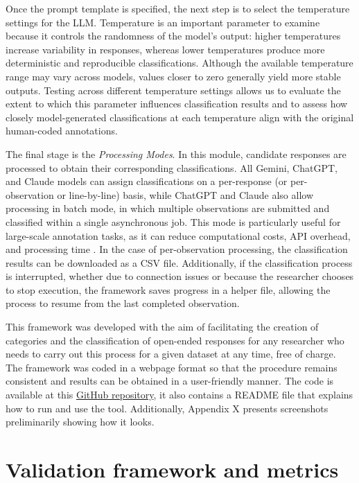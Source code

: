 \documentclass[11pt]{article}
\begin{document}
\begin{sloppypar}
Once the prompt template is specified, the next step is to select the temperature settings for the LLM. Temperature is an important parameter to examine because it controls the randomness of the model’s output: higher temperatures increase variability in responses, whereas lower temperatures produce more deterministic and reproducible classifications. Although the available temperature range may vary across models, values closer to zero generally yield more stable outputs. Testing across different temperature settings allows us to evaluate the extent to which this parameter influences classification results and to assess how closely model-generated classifications at each temperature align with the original human-coded annotations.

The final stage is the \textit{Processing Modes}. In this module, candidate responses are processed to obtain their corresponding classifications. All Gemini, ChatGPT, and Claude models can assign classifications on a per-response (or per-observation or line-by-line) basis, while ChatGPT and Claude also allow processing in batch mode, in which multiple observations are submitted and classified within a single asynchronous job. This mode is particularly useful for large-scale annotation tasks, as it can reduce computational costs, API overhead, and processing time \citep{openaibatch2024}. In the case of per-observation processing, the classification results can be downloaded as a CSV file. Additionally, if the classification process is interrupted, whether due to connection issues or because the researcher chooses to stop execution, the framework saves progress in a helper file, allowing the process to resume from the last completed observation.

This framework was developed with the aim of facilitating the creation of categories and the classification of open-ended responses for any researcher who needs to carry out this process for a given dataset at any time, free of charge. The framework was coded in a webpage format so that the procedure remains consistent and results can be obtained in a user-friendly manner. The code is available at this \href{https://github.com/sophiearisti/LLMS_Project.git}{GitHub repository}, it also contains a README file that explains how to run and use the tool. Additionally, Appendix X presents screenshots preliminarily showing how it looks.


\section{Validation framework and metrics}\label{s-evaluation}


\end{sloppypar}
\end{document}
